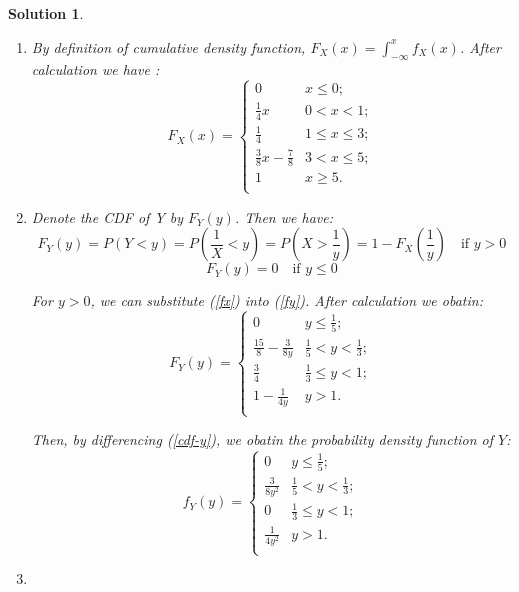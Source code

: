 \documentclass[a4paper,UTF8]{article}
\numberwithin{equation}{section}
\newtheorem*{mySol}{Solution}
\begin{document}
\begin{mySol}

\begin{enumerate}[{(}1{)}]
\item 
By definition of cumulative density function,  $F_X(x) = \int_{-\infty}^x f_X(x)$. After calculation we have :
\begin{equation}\label{fx}
	F_X(x) = 
	\begin{cases}
		0 &  x \leq 0;\\
		\frac{1}{4}x & 0<x<1;\\
		\frac{1}{4} & 1 \leq x \leq 3;\\
		\frac{3}{8}x - \frac{7}{8} & 3<x\leq5;\\
		1 & x \geq 5.\\
	\end{cases}
\end{equation}

\item
Denote the CDF of Y by $F_Y(y)$. Then we have:
\begin{equation}\label{fy}
F_Y(y)=P(Y<y)=P(\frac{1}{X} <y)=P(X>\frac{1}{y})=1-F_X(\frac{1}{y}) \quad \mbox{if } y>0 
\end{equation}
\begin{equation}
F_Y(y)=0 \quad \mbox{if } y \leq 0
\end{equation}

For $y > 0 $, we can substitute (\ref{fx}) into (\ref{fy}). After calculation we obatin:
\begin{equation} \label{cdf-y}
F_Y(y)=
	\begin{cases}
	0 & y\leq \frac{1}{5}; \\
	\frac{15}{8} - \frac{3}{8y} & \frac{1}{5} <y<\frac{1}{3};\\
	\frac{3}{4} & \frac{1}{3}	 \leq y < 1;\\
	1-\frac{1}{4y} & y>1.\\
	\end{cases}
\end{equation}
 
Then, by differencing (\ref{cdf-y}), we obatin the probability density function of $Y$:
\begin{equation*}
f_Y(y)=
	\begin{cases}
	0 & y\leq \frac{1}{5}; \\
	\frac{3}{8y^2} & \frac{1}{5} <y<\frac{1}{3};\\
	0 & \frac{1}{3}	 \leq y < 1;\\
	\frac{1}{4y^2} & y>1.\\
	\end{cases}
\end{equation*}
 \item


\end{enumerate}
\end{mySol}
\end{document}
